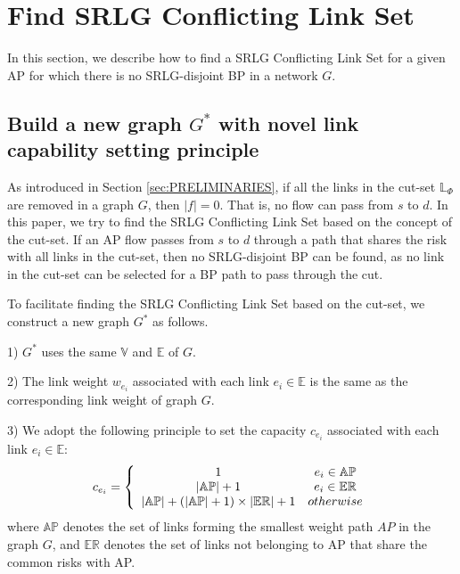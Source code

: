 \section{Find SRLG Conflicting Link Set}
\label{sec:Find SRLG conflict link set}
In this section, we describe how to find a SRLG Conflicting Link Set for a given AP for which there is no SRLG-disjoint BP in a network $G$.

\subsection{Build a new graph $G^*$ with novel link capability setting principle}


As introduced in Section \ref{sec:PRELIMINARIES},  if all the links in the cut-set $\mathbb{\mathbb{L}}_{\Phi}$ are removed in a graph $G$, then $|f| = 0$. That is, no flow can pass from $s$ to $d$. In this paper,  we try to find the SRLG Conflicting Link Set based on the concept of the cut-set. If an AP flow passes from $s$ to $d$ through a path that shares the risk with  all links in the cut-set, then no SRLG-disjoint BP can be found, as no link in the cut-set can be selected for a BP path to pass through the cut.



To facilitate finding the SRLG Conflicting Link Set based on the cut-set, we construct a new graph $G^*$ as follows.

1) $G^*$ uses the same ${\mathbb{V}}$ and ${\mathbb{E}}$ of $G$.

2) The link weight $w_{e_i}$ associated with each link $e_i \in \mathbb{E}$ is the same as the corresponding link weight of graph $G$.

3) We adopt the following principle to set the capacity $c_{e_i}$ associated with each link $e_i \in \mathbb{E}$:
  \begin{equation}
c_{e_i} = \left\{ {\begin{array}{*{20}{c}}
   1 & {e_i{\rm{ }} \in {\rm{ \mathbb{AP}}}}  \\
   {\left| \mathbb{AP} \right|+1} & {e_i{\rm{ }} \in {\rm{ \mathbb{E}}}{{\rm{\mathbb{R}}}}}  \\
   {\left| {{\rm\mathbb{AP}}} \right| + \left( {\left| {{\rm\mathbb{AP}}} \right| + 1} \right)\times \left| {{\rm{\mathbb{E}}}{{\rm{\mathbb{R}}}}} \right| + 1} & {otherwise}  \\
\end{array}} \right.
\label{eq:capacity principle}
\end{equation}
where $\mathbb{AP}$ denotes the set of links forming the smallest weight path $AP$ in the graph $G$,  and $\mathbb{\mathbb{ER}}$ denotes the set of links not belonging to AP that share the common risks with AP.

